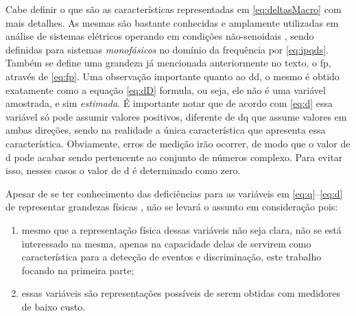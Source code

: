 Cabe definir o que são as características representadas em
\ref{eq:deltasMacro} com mais detalhes. As mesmas são bastante
conhecidas e amplamente utilizadas em análise de sistemas elétricos
operando em condições não-senoidais \cite{akagi2007instantaneous},
sendo definidas para sistemas \emph{monofásicos} no domínio da
frequência por \ref{eq:ipqds}. Também se define uma grandeza já
mencionada anteriormente no texto, o \gls{fp}, através de \ref{eq:fp}.
Uma observação importante quanto ao \acs{dd}, o mesmo é obtido
exatamente como a equação \ref{eq:dD} formula, ou seja, ele não é uma
variável amostrada, e sim \emph{estimada}. É importante notar que de
acordo com \ref{eq:d} essa variável só pode assumir valores positivos,
diferente de \acs{dq} que assume valores em ambas direções, sendo na
realidade a única característica que apresenta essa característica.
Obviamente, erros de medição irão ocorrer, de modo que o valor de
\acs{d} pode acabar sendo pertencente ao conjunto de números complexo.
Para evitar isso, nesses casos o valor de \acs{d} é determinado como
zero.

Apesar de se ter conhecimento das deficiências para as variáveis em
\ref{eq:q}--\ref{eq:d} de representar grandezas físicas \cite[cap.
2]{akagi2007instantaneous}, não se levará o assunto em consideração
pois: 

\begin{enumerate}
\item mesmo que a representação física dessas variáveis não seja clara, 
não se está interessado na mesma, apenas na capacidade delas de
servirem como característica para a detecção de eventos e
discriminação, este trabalho focando na primeira parte;
\item essas variáveis são representações possíveis de serem obtidas com
medidores de baixo custo. 
\end{enumerate}

